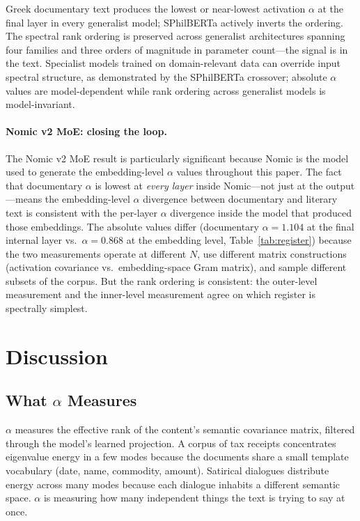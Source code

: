 \documentclass[12pt,letterpaper]{article}
\newcommand{\al}{\alpha}
\begin{document}
Greek documentary text produces the lowest or near-lowest
activation $\al$ at the final layer in every generalist model;
SPhilBERTa actively inverts the ordering.  The spectral rank
ordering is preserved across generalist architectures spanning four
families and three orders of magnitude in parameter count---the
signal is in the text.  Specialist models trained on
domain-relevant data can override input spectral structure, as
demonstrated by the SPhilBERTa crossover; absolute $\al$ values
are model-dependent while rank ordering across generalist models
is model-invariant.

\paragraph{Nomic v2 MoE: closing the loop.}  The Nomic v2 MoE
result is particularly significant because Nomic is the model used
to generate the embedding-level $\al$ values throughout this paper.
The fact that documentary $\al$ is lowest at \emph{every layer}
inside Nomic---not just at the output---means the embedding-level
$\al$ divergence between documentary and literary text is consistent
with the per-layer $\al$ divergence inside the model that produced
those embeddings.  The absolute values differ (documentary $\al =
1.104$ at the final internal layer vs.\ $\al = 0.868$ at the
embedding level, Table~\ref{tab:register}) because the two
measurements operate at different $N$, use different matrix
constructions (activation covariance vs.\ embedding-space Gram
matrix), and sample different subsets of the corpus.  But the
rank ordering is consistent: the outer-level measurement and the
inner-level measurement agree on which register is spectrally
simplest.


\section{Discussion}
\label{sec:discussion}

\subsection{What $\al$ Measures}

$\al$ measures the effective rank of the content's semantic
covariance matrix, filtered through the model's learned projection.
A corpus of tax receipts concentrates eigenvalue energy in a few
modes because the documents share a small template vocabulary (date,
name, commodity, amount).  Satirical dialogues distribute energy
across many modes because each dialogue inhabits a different semantic
space.  $\al$ is measuring how many independent things the text is
trying to say at once.
\end{document}
